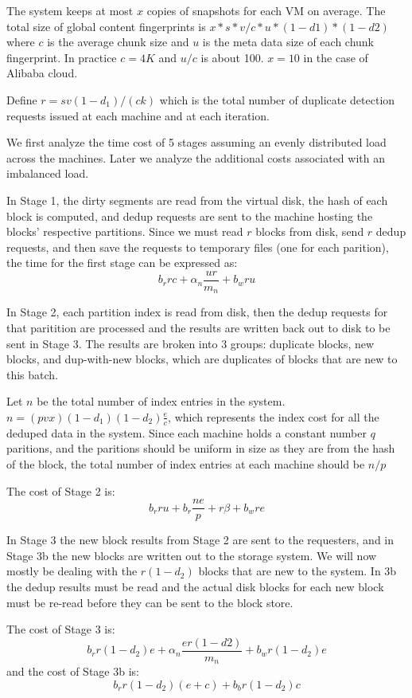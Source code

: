 The system keeps at most  $ x$ copies of snapshots for each VM on average.  The total size of  global content fingerprints is $x*s*v/c*u *(1-d1)*(1-d2)$ where $c$ is the average chunk size and $u$ is the meta data size of each chunk fingerprint. In practice $c=4K$ and $u/c$  is about 100.  $x=10$ in the case of Alibaba cloud.

Define $r = s v (1-d_1)/(ck)$  which is the total number of duplicate detection requests issued at each machine and at each iteration.

We first analyze the time cost of 5 stages assuming an evenly distributed load
across the machines. Later we analyze the additional costs associated with an
imbalanced load.

In Stage 1, the dirty segments are read from the virtual disk, the hash of each
block is computed, and dedup requests are sent to the machine hosting the
blocks' respective partitions. Since we must read $r$ blocks from disk, send
$r$ dedup requests, and then save the requests to temporary files (one for each
parition), the time for the first stage can be expressed as:
\[
    b_r r c + \alpha_n\frac{u r}{m_n} + b_w r u
\]

In Stage 2, each partition index is read from disk, then the dedup requests for
that paritition are processed and the results are written back out to disk to
be sent in Stage 3. The results are broken into 3 groups: duplicate blocks, new
blocks, and dup-with-new blocks, which are duplicates of blocks that are new to
this batch.

Let $n$ be the total number of index entries in the system.
$n=(p v x)(1-d_1)(1-d_2)\frac{e}{c}$,
which represents the index cost for all the deduped data in the system.
Since each machine holds a constant number $q$ paritions, and the paritions
should be uniform in size as they are from the hash of the block,
the total number of index entries at each machine should be $n/p$

The cost of Stage 2 is:
\[
    b_r r u + b_r\frac{n e}{p} + r \beta + b_w r e
\]

In Stage 3 the new block results from Stage 2 are sent to the requesters, and
in Stage 3b the new blocks are written out to the storage system. We will now
mostly be dealing with the $r(1-d_2)$ blocks that are new to the system. In 3b
the dedup results must be read and the actual disk blocks for each new block
must be re-read before they can be sent to the block store.

The cost of Stage 3 is:
\[
    b_r r(1-d_2)e + \alpha_n\frac{e r(1-d2)}{m_n} + b_w r(1-d_2)e
\]
and the cost of Stage 3b is:
\[
    b_r r(1-d_2)(e+c) + b_b r(1-d_2)c
\]

